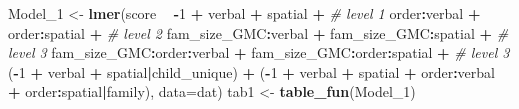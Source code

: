 \documentclass[]{article}
\newenvironment{Shaded}{\begin{snugshade}}{\end{snugshade}}
\newcommand{\KeywordTok}[1]{\textcolor[rgb]{0.13,0.29,0.53}{\textbf{#1}}}
\newcommand{\DataTypeTok}[1]{\textcolor[rgb]{0.13,0.29,0.53}{#1}}
\newcommand{\DecValTok}[1]{\textcolor[rgb]{0.00,0.00,0.81}{#1}}
\newcommand{\StringTok}[1]{\textcolor[rgb]{0.31,0.60,0.02}{#1}}
\newcommand{\CommentTok}[1]{\textcolor[rgb]{0.56,0.35,0.01}{\textit{#1}}}
\newcommand{\OperatorTok}[1]{\textcolor[rgb]{0.81,0.36,0.00}{\textbf{#1}}}
\newcommand{\NormalTok}[1]{#1}
\begin{document}
\begin{Shaded}
\begin{Highlighting}[]
\NormalTok{Model_}\DecValTok{1}\NormalTok{ <-}\StringTok{ }\KeywordTok{lmer}\NormalTok{(score }\OperatorTok{~}\StringTok{ }
\StringTok{                }\OperatorTok{-}\DecValTok{1} \OperatorTok{+}\StringTok{ }\NormalTok{verbal }\OperatorTok{+}\StringTok{ }\NormalTok{spatial }\OperatorTok{+}\StringTok{ }\CommentTok{# level 1}
\StringTok{                }\NormalTok{order}\OperatorTok{:}\NormalTok{verbal }\OperatorTok{+}\StringTok{ }\NormalTok{order}\OperatorTok{:}\NormalTok{spatial }\OperatorTok{+}\StringTok{  }\CommentTok{# level 2}
\StringTok{                }\NormalTok{fam_size_GMC}\OperatorTok{:}\NormalTok{verbal }\OperatorTok{+}\StringTok{ }\NormalTok{fam_size_GMC}\OperatorTok{:}\NormalTok{spatial }\OperatorTok{+}\StringTok{ }\CommentTok{# level 3}
\StringTok{                }\NormalTok{fam_size_GMC}\OperatorTok{:}\NormalTok{order}\OperatorTok{:}\NormalTok{verbal }\OperatorTok{+}\StringTok{ }\NormalTok{fam_size_GMC}\OperatorTok{:}\NormalTok{order}\OperatorTok{:}\NormalTok{spatial }\OperatorTok{+}\StringTok{ }\CommentTok{# level 3}
\StringTok{                }\NormalTok{(}\OperatorTok{-}\DecValTok{1} \OperatorTok{+}\StringTok{ }\NormalTok{verbal }\OperatorTok{+}\StringTok{ }\NormalTok{spatial}\OperatorTok{|}\NormalTok{child_unique) }\OperatorTok{+}
\StringTok{                }\NormalTok{(}\OperatorTok{-}\DecValTok{1} \OperatorTok{+}\StringTok{ }\NormalTok{verbal }\OperatorTok{+}\StringTok{ }\NormalTok{spatial }\OperatorTok{+}\StringTok{ }\NormalTok{order}\OperatorTok{:}\NormalTok{verbal }\OperatorTok{+}\StringTok{ }\NormalTok{order}\OperatorTok{:}\NormalTok{spatial}\OperatorTok{|}\NormalTok{family),}
                \DataTypeTok{data=}\NormalTok{dat) }
\NormalTok{tab1    <-}\StringTok{ }\KeywordTok{table_fun}\NormalTok{(Model_}\DecValTok{1}\NormalTok{)}


\end{Highlighting}
\end{Shaded}
\end{document}
